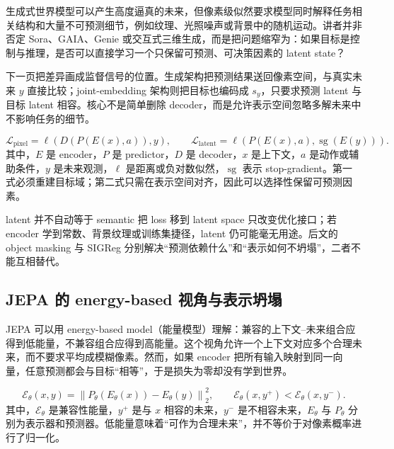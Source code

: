 生成式世界模型可以产生高度逼真的未来，但像素级似然要求模型同时解释任务相关结构和大量不可预测细节，例如纹理、光照噪声或背景中的随机运动。讲者并非否定 Sora、GAIA、Genie 或交互式三维生成，而是把问题缩窄为：如果目标是控制与推理，是否可以直接学习一个只保留可预测、可决策因素的 latent state？


下一页把差异画成监督信号的位置。生成架构把预测结果送回像素空间，与真实未来 $y$ 直接比较；joint-embedding 架构则把目标也编码成 $s_y$，只要求预测 latent 与目标 latent 相容。核心不是简单删除 decoder，而是允许表示空间忽略多解未来中不影响任务的细节。


\[
\mathcal{L}_{\text{pixel}}=\ell\!\left(D(P(E(x),a)),y\right),
\qquad
\mathcal{L}_{\text{latent}}=\ell\!\left(P(E(x),a),\operatorname{sg}(E(y))\right).
\]
其中，$E$ 是 encoder，$P$ 是 predictor，$D$ 是 decoder，$x$ 是上下文，$a$ 是动作或辅助条件，$y$ 是未来观测，$\ell$ 是距离或负对数似然，$\operatorname{sg}$ 表示 stop-gradient。第一式必须重建目标域；第二式只需在表示空间对齐，因此可以选择性保留可预测因素。

\begin{warningbox}{latent 并不自动等于 semantic}
把 loss 移到 latent space 只改变优化接口；若 encoder 学到常数、背景纹理或训练集捷径，latent 仍可能毫无用途。后文的 object masking 与 SIGReg 分别解决``预测依赖什么''和``表示如何不坍塌''，二者不能互相替代。
\end{warningbox}

\subsection{JEPA 的 energy-based 视角与表示坍塌}

JEPA 可以用 energy-based model（能量模型）理解：兼容的上下文--未来组合应得到低能量，不兼容组合应得到高能量。这个视角允许一个上下文对应多个合理未来，而不要求平均成模糊像素。然而，如果 encoder 把所有输入映射到同一向量，任意预测都会与目标``相等''，于是损失为零却没有学到世界。


\[
\mathcal{E}_\theta(x,y)=\left\|P_\theta(E_\theta(x))-E_\theta(y)\right\|_2^2,
\qquad
\mathcal{E}_\theta(x,y^+) < \mathcal{E}_\theta(x,y^-).
\]
其中，$\mathcal{E}_\theta$ 是兼容性能量，$y^+$ 是与 $x$ 相容的未来，$y^-$ 是不相容未来，$E_\theta$ 与 $P_\theta$ 分别为表示器和预测器。低能量意味着``可作为合理未来''，并不等价于对像素概率进行了归一化。

